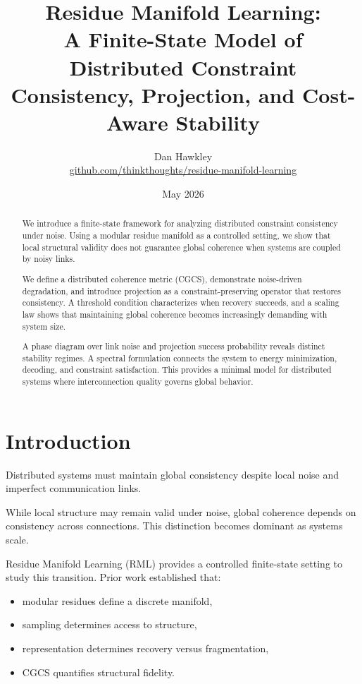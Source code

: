 \documentclass[11pt]{article}
\title{
Residue Manifold Learning:\\
A Finite-State Model of Distributed Constraint Consistency, Projection, and Cost-Aware Stability
}
\author{
Dan Hawkley\\
\href{https://github.com/thinkthoughts/residue-manifold-learning}{github.com/thinkthoughts/residue-manifold-learning}
}
\date{May 2026}
\begin{document}
\maketitle

\begin{abstract}
We introduce a finite-state framework for analyzing distributed constraint consistency under noise. Using a modular residue manifold as a controlled setting, we show that local structural validity does not guarantee global coherence when systems are coupled by noisy links.

We define a distributed coherence metric (CGCS), demonstrate noise-driven degradation, and introduce projection as a constraint-preserving operator that restores consistency. A threshold condition characterizes when recovery succeeds, and a scaling law shows that maintaining global coherence becomes increasingly demanding with system size.

A phase diagram over link noise and projection success probability reveals distinct stability regimes. A spectral formulation connects the system to energy minimization, decoding, and constraint satisfaction. This provides a minimal model for distributed systems where interconnection quality governs global behavior.
\end{abstract}

\section{Introduction}

Distributed systems must maintain global consistency despite local noise and imperfect communication links.

While local structure may remain valid under noise, global coherence depends on consistency across connections. This distinction becomes dominant as systems scale.

Residue Manifold Learning (RML) provides a controlled finite-state setting to study this transition. Prior work established that:

\begin{itemize}[leftmargin=*]
\item modular residues define a discrete manifold,
\item sampling determines access to structure,
\item representation determines recovery versus fragmentation,
\item CGCS quantifies structural fidelity.
\end{itemize}
\end{document}
